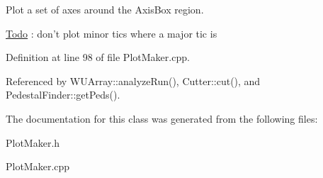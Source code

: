 Plot a set of axes around the AxisBox region. 

\begin{Desc}
\item[\hyperlink{todo__todo000030}{Todo}]: don't plot minor tics where a major tic is \end{Desc}


Definition at line 98 of file PlotMaker.cpp.



Referenced by WUArray::analyzeRun(), Cutter::cut(), and PedestalFinder::getPeds().



The documentation for this class was generated from the following files:\begin{DoxyCompactItemize}
\item 
PlotMaker.h\item 
PlotMaker.cpp\end{DoxyCompactItemize}
